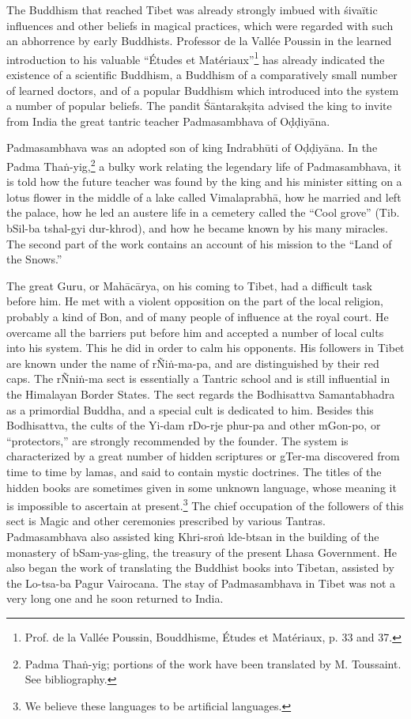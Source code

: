 \documentclass[a4paper, 12pt, oneside]{article}
\begin{document}
The Buddhism that reached Tibet was already strongly imbued with \'{s}ivaïtic influences and other beliefs in magical practices, which were regarded with such an abhorrence by early Buddhists. Professor de la Vallée Poussin in the learned introduction to his valuable ``Études et Matériaux''\footnote{Prof. de la Vallée Poussin, Bouddhisme, Études et Matériaux, p. 33 and 37.} has already indicated the existence of a scientific Buddhism, a Buddhism of a comparatively small number of learned doctors, and of a popular Buddhism which introduced into the system a number of popular beliefs. The pandit \'{S}\={a}ntarak\d{s}ita advised the king to invite from India the great tantric teacher Padmasambhava of O\d{d}\d{d}iy\={a}na.

Padmasambhava was an adopted son of king Indrabh\={u}ti of O\d{d}\d{d}iy\={a}na. In the Padma Tha\.{n}-yig,\footnote{Padma Tha\.{n}-yig; portions of the work have been translated by M. Toussaint. See bibliography.} a bulky work relating the legendary life of Padmasambhava, it is told how the future teacher was found by the king and his minister sitting on a lotus flower in the middle of a lake called Vimalaprabh\={a}, how he married and left the palace, how he led an austere life in a cemetery called the ``Cool grove'' (Tib. bSil-ba tshal-gyi dur-khrod), and how he became known by his many miracles. The second part of the work contains an account of his mission to the ``Land of the Snows.''

The great Guru, or Mah\={a}c\={a}rya, on his coming to Tibet, had a difficult task before him. He met with a violent opposition on the part of the local religion, probably a kind of Bon, and of many people of influence at the royal court. He overcame all the barriers put before him and accepted a number of local cults into his system. This he did in order to calm his opponents. His followers in Tibet are known under the name of rÑi\.{n}-ma-pa, and are distinguished by their red caps. The rÑni\.{n}-ma sect is essentially a Tantric school and is still influential in the Himalayan Border States. The sect regards the Bodhisattva Samantabhadra as a primordial Buddha, and a special cult is dedicated to him. Besides this Bodhisattva, the cults of the Yi-dam rDo-rje phur-pa and other mGon-po, or ``protectors,'' are strongly recommended by the founder. The system is characterized by a great number of hidden scriptures or gTer-ma discovered from time to time by lamas, and said to contain mystic doctrines. The titles of the hidden books are sometimes given in some unknown language, whose meaning it is impossible to ascertain at present.\footnote{We believe these languages to be artificial languages.} The chief occupation of the followers of this sect is Magic and other ceremonies prescribed by various Tantras. Padmasambhava also assisted king Khri-sro\.{n} lde-btsan in the building of the monastery of bSam-yas-gling, the treasury of the present Lhasa Government. He also began the work of translating the Buddhist books into Tibetan, assisted by the Lo-tsa-ba Pagur Vairocana. The stay of Padmasambhava in Tibet was not a very long one and he soon returned to India.
\end{document}

